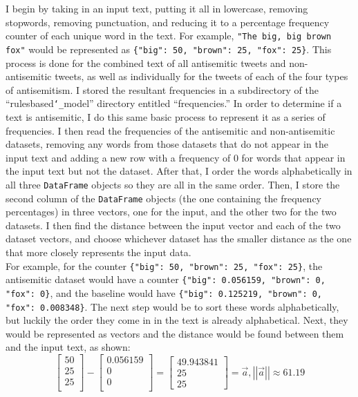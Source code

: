 \documentclass{article}
\begin{document}
I begin by taking in an input text, putting it all in lowercase, removing stopwords, removing punctuation, and reducing it to a percentage frequency counter of each unique word in the text. For example, \texttt{"The big, big brown fox"} would be represented as \texttt{\{"big": 50, "brown": 25, "fox": 25\}}. This process is done for the combined text of all antisemitic tweets and non-antisemitic tweets, as well as individually for the tweets of each of the four types of antisemitism. I stored the resultant frequencies in a subdirectory of the ``rulesbased\texttt{\char`_}model'' directory entitled ``frequencies.'' In order to determine if a text is antisemitic, I do this same basic process to represent it as a series of frequencies. I then read the frequencies of the antisemitic and non-antisemitic datasets, removing any words from those datasets that do not appear in the input text and adding a new row with a frequency of 0 for words that appear in the input text but not the dataset. After that, I order the words alphabetically in all three \texttt{DataFrame} objects so they are all in the same order. Then, I store the second column of the \texttt{DataFrame} objects (the one containing the frequency percentages) in three vectors, one for the input, and the other two for the two datasets. I then find the distance between the input vector and each of the two dataset vectors, and choose whichever dataset has the smaller distance as the one that more closely represents the input data.\\

For example, for the counter \texttt{\{"big": 50, "brown": 25, "fox": 25\}}, the antisemitic dataset would have a counter \texttt{\{"big": 0.056159, "brown": 0, "fox": 0\}}, and the baseline would have \texttt{\{"big": 0.125219, "brown": 0, "fox": 0.008348\}}. The next step would be to sort these words alphabetically, but luckily the order they come in in the text is already alphabetical. Next, they would be represented as vectors and the distance would be found between them and the input text, as shown:\\
\[
\left[ {\begin{array}{c}
    50\\
    25\\
    25\\
  \end{array} } \right] - \left[ {\begin{array}{c}
    0.056159\\
    0\\
    0\\
  \end{array} } \right] = \left[ {\begin{array}{c}
    49.943841\\
    25\\
    25\
  \end{array} } \right] = \vec{a} , \left| \left| \vec{a} \right| \right| \approx 61.19
\]
\end{document}
